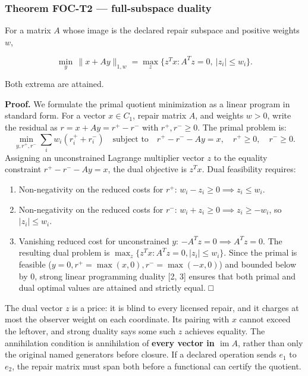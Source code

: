 \documentclass[
  11pt,
]{article}
\providecommand{\tightlist}{%
  \setlength{\itemsep}{0pt}\setlength{\parskip}{0pt}}
\begin{document}
\subsubsection{Theorem FOC-T2 --- full-subspace duality}\label{theorem-foc-t2-full-subspace-duality}

For a matrix \(A\) whose image is the declared repair subspace and positive weights \(w\),

\[
\min_y\,\|x+Ay\|_{1,w}
=\max_z\bigl\{z^T x:A^T z=0,\ |z_i|\le w_i\bigr\}.
\]

Both extrema are attained.

\textbf{Proof.} We formulate the primal quotient minimization as a linear program in standard form. For a vector \(x \in C_1\), repair matrix \(A\), and weights \(w > 0\), write the residual as \(r = x + A y = r^+ - r^-\) with \(r^+, r^- \ge 0\). The primal problem is: \[
\min_{y, r^+, r^-} \sum_{i} w_i (r_i^+ + r_i^-) \quad \text{subject to} \quad r^+ - r^- - A y = x, \quad r^+ \ge 0, \quad r^- \ge 0.
\] Assigning an unconstrained Lagrange multiplier vector \(z\) to the equality constraint \(r^+ - r^- - A y = x\), the dual objective is \(z^T x\). Dual feasibility requires:

\begin{enumerate}
\def\labelenumi{\arabic{enumi}.}
\tightlist
\item
  Non-negativity on the reduced costs for \(r^+\): \(w_i - z_i \ge 0 \implies z_i \le w_i\).
\item
  Non-negativity on the reduced costs for \(r^-\): \(w_i + z_i \ge 0 \implies z_i \ge -w_i\), so \(|z_i| \le w_i\).
\item
  Vanishing reduced cost for unconstrained \(y\): \(-A^T z = 0 \implies A^T z = 0\). The resulting dual problem is \(\max_z \{z^T x : A^T z = 0, |z_i| \le w_i\}\). Since the primal is feasible (\(y=0, r^+ = \max(x, 0), r^- = \max(-x, 0)\)) and bounded below by \(0\), strong linear programming duality {[}2, 3{]} ensures that both primal and dual optimal values are attained and strictly equal. □
\end{enumerate}

The dual vector \(z\) is a price: it is blind to every licensed repair, and it charges at most the observer weight on each coordinate. Its pairing with \(x\) cannot exceed the leftover, and strong duality says some such \(z\) achieves equality. The annihilation condition is annihilation of \textbf{every vector in \(\operatorname{im} A\)}, rather than only the original named generators before closure. If a declared operation sends \(e_1\) to \(e_2\), the repair matrix must span both before a functional can certify the quotient.
\end{document}
